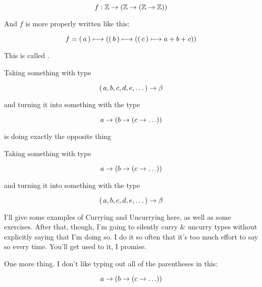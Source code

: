 \begin{equation}
   f : \mathbb{Z} \to \left( \mathbb{Z} \to \left( \mathbb{Z} \to \mathbb{Z} \right) \right)
\end{equation}

And $f$ is more properly written like this:

\begin{equation}
    f = \left(\, a \,\right) \longmapsto \left( \left(\, b \,\right) \longmapsto \left( \left(\, c \,\right) \longmapsto a + b + c \right) \right)
\end{equation}

This is called .

\begin{definition}[Currying]
    \label{def:currying}
    Taking something with type

    \begin{equation}
        \left(\, a,b,c,d,e,\dots \,\right) \to \beta
    \end{equation}

    and turning it into something with the type

    \begin{equation}
        a \to \parens{b \to \parens{c \to \dots}}
    \end{equation}
\end{definition}

 is doing exactly the opposite thing

\begin{definition}[Uncurrying]
    \label{def:uncurrying}
    Taking something with type

    \begin{equation}
        a \to \parens{b \to \parens{c \to \dots}}
    \end{equation}

    and turning it into something with the type

    \begin{equation}
        \left(\, a,b,c,d,e,\dots \,\right) \to \beta
    \end{equation}
\end{definition}

I'll give some examples of Currying and Uncurrying here, as well as some
exercises. After that, though, I'm going to silently curry \& uncurry types
without explicitly saying that I'm doing so. I do it so often that it's too much
effort to say so every time. You'll get used to it, I promise.

One more thing. I don't like typing out all of the parentheses in this:

\begin{equation}
    a \to \parens{b \to \parens{c \to \dots}}
\end{equation}

